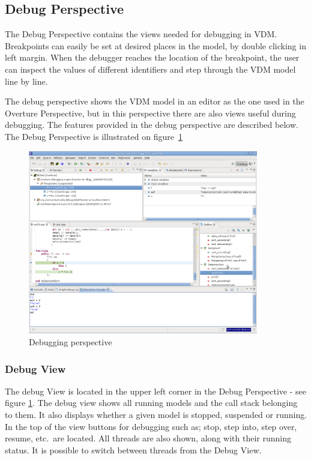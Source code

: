 \subsection{Debug Perspective}

The Debug Perspective contains the views needed for debugging in VDM. Breakpoints
can easily be set at desired places in the model, by double clicking in left
margin. When the debugger reaches the location of the breakpoint, the user can
inspect the values of different identifiers and step through the VDM model line
by line.
 
The debug perspective shows the VDM model in an editor as the one used in the
Overture Perspective, but in this perspective there are also views useful during
debugging. The features provided in the debug perspective are described below.
The Debug Perspective is illustrated on figure~\ref{fig:userguide:DebuggingVDM}

\begin{figure}[htp]
\begin{center}
  \includegraphics[width=380px]{figures/DebuggingVDM}
  \caption[Debugging perspective]{Debugging perspective}
  \label{fig:userguide:DebuggingVDM}
\end{center}
\end{figure}


\subsubsection{Debug View}
The debug View is located in the upper left corner in the Debug Perspective -
see figure \ref{fig:userguide:DebuggingVDM}. The debug view shows all running
models and the call stack belonging to them. It also displays whether a given model is
stopped, suspended or running. In the top of the view buttons
for debugging such as; stop, step into, step over, resume, etc.\ are located.
All threads are also shown, along with their running status. It is possible to
switch between threads from the Debug View.

